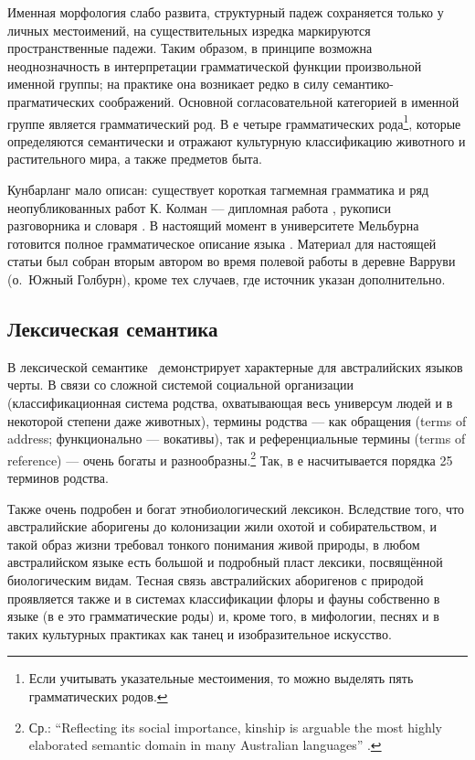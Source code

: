 Именная морфология слабо развита, структурный падеж сохраняется только у личных местоимений, на существительных изредка маркируются пространственные падежи. Таким образом, в принципе возможна неоднозначность в интерпретации грамматической функции произвольной именной группы; на практике она возникает редко в силу семантико-прагматических соображений. Основной согласовательной категорией в именной группе является грамматический род. В  е четыре грамматических рода\footnote{Если учитывать указательные местоимения, то можно выделять пять грамматических родов.}, которые определяются семантически и отражают культурную классификацию животного и растительного мира, а также предметов быта.

Кунбарланг мало описан: существует короткая тагмемная грамматика \cite{harris69} и ряд неопубликованных работ К. Колман --- дипломная работа \cite{coleman82}, рукописи разговорника \parencite{wordgra} и словаря \parencite{coleman10}. В настоящий момент в университете Мельбурна готовится полное грамматическое описание языка \parencite{ikwlg}.  Материал для настоящей статьи был собран вторым автором во время полевой работы в деревне Варруви (о.\ Южный Голбурн), кроме тех случаев, где источник указан дополнительно.

\subsection{Лексическая семантика}
\label{sec:lexsemover}
В лексической семантике \ демонстрирует характерные для австралийских языков черты. В связи со сложной системой социальной организации (классификационная система родства, охватывающая весь универсум людей и в некоторой степени даже животных), термины родства --- как обращения (terms of address; функционально --- вокативы), так и референциальные термины (terms of reference) --- очень богаты и разнообразны.\footnote{Ср.: ``Reflecting its social importance, kinship is arguable the most highly elaborated semantic domain in many Australian languages'' \autocite[304]{gabysinger14}.} Так, в  е насчитывается порядка 25 терминов родства.

Также очень подробен и богат этнобиологический лексикон. Вследствие того, что австралийские аборигены до колонизации жили охотой и собирательством, и такой образ жизни требовал тонкого понимания живой природы, в любом австралийском языке есть большой и подробный пласт лексики, посвящённой биологическим видам. Тесная связь австралийских аборигенов с природой проявляется также и в системах классификации флоры и фауны собственно в языке (в  е это грамматические роды) и, кроме того, в мифологии, песнях и в таких культурных практиках как танец и изобразительное искусство.

